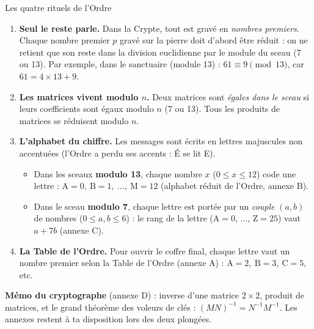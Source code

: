 \documentclass[11pt,a4paper]{article}
\begin{document}
\begin{rituel}{Les quatre rituels de l'Ordre}
\begin{enumerate}[label=\textbf{R\arabic*.},leftmargin=10mm]
  \item \textbf{Seul le reste parle.} Dans la Crypte, tout est gravé en
        \emph{nombres premiers}. Chaque nombre premier $p$ gravé sur la pierre
        doit d'abord être réduit : on ne retient que son reste dans la division
        euclidienne par le module du sceau (7 ou 13).
        Par exemple, dans le sanctuaire (module 13) : $61 \equiv 9 \pmod{13}$,
        car $61 = 4\times 13 + 9$.
  \item \textbf{Les matrices vivent modulo $n$.} Deux matrices sont
        \emph{égales dans le sceau} si leurs coefficients sont égaux modulo $n$
        (7 ou 13). Tous les produits de matrices se réduisent modulo $n$.
  \item \textbf{L'alphabet du chiffre.} Les messages sont écrits en lettres
        majuscules non accentuées (l'Ordre a perdu ses accents : É se lit E).
        \begin{itemize}
          \item Dans les sceaux \textbf{modulo 13}, chaque nombre $x$
                ($0\leqslant x \leqslant 12$) code une lettre :
                $\text{A}=0,\ \text{B}=1,\ \dots,\ \text{M}=12$
                (alphabet réduit de l'Ordre, annexe B).
          \item Dans le sceau \textbf{modulo 7}, chaque lettre est portée par un
                \emph{couple} $(a,b)$ de nombres ($0\leqslant a,b\leqslant 6$) :
                le rang de la lettre ($\text{A}=0$, $\dots$, $\text{Z}=25$) vaut
                $a + 7b$ (annexe C).
        \end{itemize}
  \item \textbf{La Table de l'Ordre.} Pour ouvrir le coffre final, chaque lettre
        vaut un nombre premier selon la Table de l'Ordre (annexe A) :
        $\text{A}=2,\ \text{B}=3,\ \text{C}=5$, etc.
\end{enumerate}
\end{rituel}

\begin{conseil}
\textbf{Mémo du cryptographe} (annexe D) : inverse d'une matrice $2\times 2$,
produit de matrices, et le grand théorème des voleurs de clés :
$(M N)^{-1} = N^{-1} M^{-1}$. Les annexes restent à ta disposition
lors des deux plongées.
\end{conseil}
\end{document}
